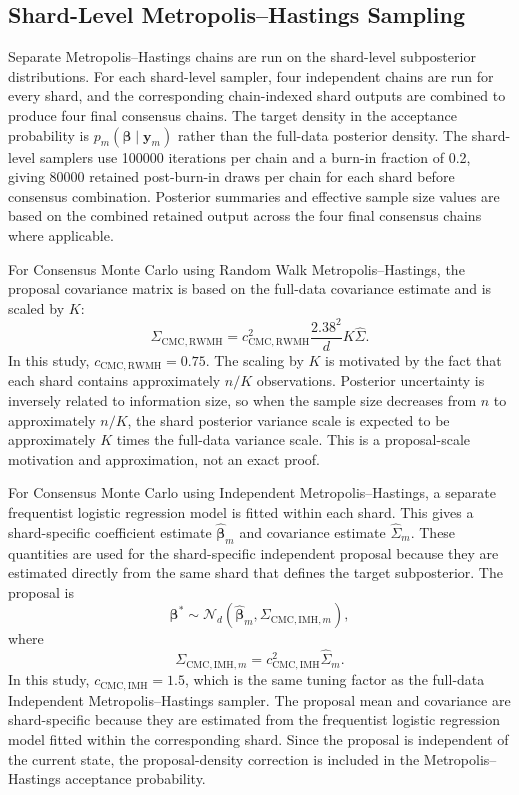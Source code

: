 \subsection{Shard-Level Metropolis--Hastings Sampling}

Separate Metropolis--Hastings chains are run on the shard-level subposterior distributions. For each shard-level sampler, four independent chains are run for every shard, and the corresponding chain-indexed shard outputs are combined to produce four final consensus chains. The target density in the acceptance probability is $p_m(\boldsymbol{\beta}\mid \mathbf{y}_m)$ rather than the full-data posterior density. The shard-level samplers use 100000 iterations per chain and a burn-in fraction of 0.2, giving 80000 retained post-burn-in draws per chain for each shard before consensus combination. Posterior summaries and effective sample size values are based on the combined retained output across the four final consensus chains where applicable.

For Consensus Monte Carlo using Random Walk Metropolis--Hastings, the proposal covariance matrix is based on the full-data covariance estimate and is scaled by $K$:
\[
\Sigma_{\mathrm{CMC,RWMH}}
=
c_{\mathrm{CMC,RWMH}}^2
\frac{2.38^2}{d}
K\widehat{\Sigma}.
\]
In this study, $c_{\mathrm{CMC,RWMH}}=0.75$. The scaling by $K$ is motivated by the fact that each shard contains approximately $n/K$ observations. Posterior uncertainty is inversely related to information size, so when the sample size decreases from $n$ to approximately $n/K$, the shard posterior variance scale is expected to be approximately $K$ times the full-data variance scale. This is a proposal-scale motivation and approximation, not an exact proof.

For Consensus Monte Carlo using Independent Metropolis--Hastings, a separate frequentist logistic regression model is fitted within each shard. This gives a shard-specific coefficient estimate $\widehat{\boldsymbol{\beta}}_m$ and covariance estimate $\widehat{\Sigma}_m$. These quantities are used for the shard-specific independent proposal because they are estimated directly from the same shard that defines the target subposterior. The proposal is
\[
\boldsymbol{\beta}^{*}
\sim
\mathcal{N}_d(
\widehat{\boldsymbol{\beta}}_m,
\Sigma_{\mathrm{CMC,IMH},m}
),
\]
where
\[
\Sigma_{\mathrm{CMC,IMH},m}
=
c_{\mathrm{CMC,IMH}}^2
\widehat{\Sigma}_m.
\]
In this study, $c_{\mathrm{CMC,IMH}}=1.5$, which is the same tuning factor as the full-data Independent Metropolis--Hastings sampler. The proposal mean and covariance are shard-specific because they are estimated from the frequentist logistic regression model fitted within the corresponding shard. Since the proposal is independent of the current state, the proposal-density correction is included in the Metropolis--Hastings acceptance probability.

